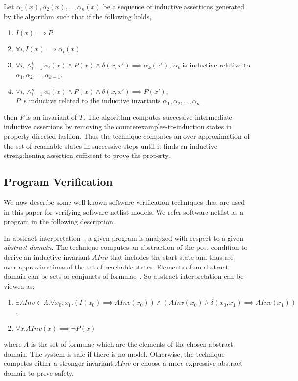 %
Let $\alpha_1(x), \alpha_2(x),...,\alpha_n(x)$ be a sequence of 
inductive assertions generated by the algorithm such that if the 
following holds,
\begin{enumerate}
 \item $I(x) \implies P$
 \item $\forall i, I(x) \implies \alpha_i(x)$
 \item $\forall i, \wedge_{i=1}^{k} \alpha_i(x) \wedge P(x) \wedge \delta(x,x') \implies \alpha_k(x')$,
 $\alpha_k$ is inductive relative to $\alpha_1, \alpha_2, ...,\alpha_{k-1}$.
 \item $\forall i, \wedge_{i=1}^{n} \alpha_i(x) \wedge P(x) \wedge \delta(x,x') \implies P(x')$, \\
 $P$ is inductive related to the inductive invariants $\alpha_1, \alpha_2, ...,\alpha_n$.
\end{enumerate}
then $P$ is an invariant of $T$. The algorithm computes successive intermediate 
inductive assertions by removing the counterexamples-to-induction states in 
property-directed fashion.  Thus the technique computes an over-approximation 
of the set of reachable states in successive steps until it finds an 
inductive strengthening assertion sufficient to prove the property. 


\subsection{Program Verification}
%
We now describe some well known software verification techniques that are 
used in this paper for verifying software netlist models.  We refer software 
netlist as a program in the following description. 
  
%
In abstract interpretation~\cite{DBLP:journals/corr/abs-cs-0701193,DBLP:conf/emsoft/Cousot07},
a given program is analyzed with respect to a given \emph{abstract domain}.  
The technique computes an abstraction of the post-condition to derive an 
inductive invariant $AInv$ that includes the start state and thus are 
over-approximations of the set of reachable states. Elements of an abstract 
domain can be sets or conjuncts of formulae~\cite{vmcai-2013}. So abstract 
interpretation can be viewed as:
\begin{enumerate}
\item  $\exists AInv \in A. \forall x_0, x_1. (I(x_0) \implies AInv(x_0)) 
\wedge (AInv(x_0) \wedge \delta(x_0, x_1) \implies AInv(x_1))$, 
\item $\forall x. AInv(x) \implies \neg{P(x)}$
\end{enumerate}
where $A$ is the set of formulae which are the elements of the 
chosen abstract domain. The system is safe if there is no model. 
Otherwise, the technique computes either a stronger invariant 
$AInv$ or choose a more expressive abstract domain to prove safety.

